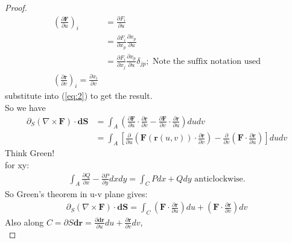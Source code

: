 \documentclass[a4paper]{article}
\begin{document}
\begin{proof}
\begin{equation*}
\begin{aligned}
\left(\frac{\partial \mathbf{F}}{\partial u}\right)_i &= \frac{\partial F_i}{\partial u}\\
&= \frac{\partial F_i}{\partial x_p}\frac{\partial x_p}{\partial u}\\
&= \frac{\partial F_i}{\partial x_j}\frac{\partial x_p}{\partial u}\delta_{jp}; \text{  Note the suffix notation used}\\
\left(\frac{\partial \mathbf{r}}{\partial v}\right)_i = \frac{\partial x_i}{\partial v}
\end{aligned}
\end{equation*}
substitute into (\ref{eq:2}) to get the result.\\

So we have
\begin{equation*}
\begin{aligned}
\partial_S \left(\nabla\times\mathbf{F}\right)\cdot\mathbf{dS}&=\int_A \left(\frac{\partial \mathbf{F}}{\partial u}\cdot\frac{\partial \mathbf{r}}{\partial v}-\frac{\partial \mathbf{F}}{\partial v} \cdot \frac{\partial \mathbf{r}}{\partial u}\right) dudv\\
&=\int_A \left[\frac{\partial}{\partial u}\left(\mathbf{F}\left(\mathbf{r}\left(u,v\right)\right)\cdot\frac{\partial \mathbf{r}}{\partial v}\right)-\frac{\partial}{\partial v}\left(\mathbf{F}\cdot\frac{\partial \mathbf{r}}{\partial u}\right)\right]dudv
\end{aligned}
\end{equation*}
Think Green!\\
for xy: 
\begin{equation*}
\begin{aligned}
\int_A \frac{\partial Q}{\partial x} - \frac{\partial P}{\partial y}dxdy = \int_C Pdx + Qdy \text{  anticlockwise}.
\end{aligned}
\end{equation*}
So Green's theorem in u-v plane gives:
\begin{equation*}
\begin{aligned}
\partial_S \left(\nabla\times\mathbf{F}\right)\cdot\mathbf{dS}=\int_C \left(\mathbf{F}\cdot\frac{\partial \mathbf{r}}{\partial u}\right)du + \left(\mathbf{F}\cdot\frac{\partial \mathbf{r}}{\partial v}\right)dv
\end{aligned}
\end{equation*}
Also along $C=\partial S \mathbf{dr} = \frac{\partial \mathbf{dr}}{\partial u}du + \frac{\partial \mathbf{r}}{\partial v}dv$,\\

\end{proof}
\end{document}
